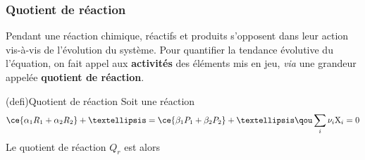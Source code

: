 \documentclass[../../main/main.tex]{subfiles}
\begin{document}

\subsubsection{Quotient de réaction}

Pendant une réaction chimique, réactifs et produits s'opposent dans leur action
vis-à-vis de l'évolution du système.
Pour quantifier la tendance évolutive du l'équation, on fait appel aux
\textbf{activités} des éléments mis en jeu, \textit{via} une grandeur appelée
\textbf{quotient de réaction}.

\begin{tcb*}[label=quoreac](defi){Quotient de réaction}
	Soit une réaction
	\[
		\ce{\alpha_1R_1 + \alpha_2R_2} +…
		=
		\ce{\beta_1P_1 +\beta_2P_2}+…
		\qou
		\sum_i \nu_i\mathrm{X}_i = 0
	\]
	Le quotient de réaction $Q_r$ est alors
	\psw{%
		\[
			\boxed{Q_r = \frac{a(\ce{P_1})^{\beta_1} \times
					a(\ce{P_2})^{\beta_2} \times…}{
					a(\ce{R_1})^{\alpha_1} \times
					a(\ce{R_2})^{\alpha_2} \times…}}
			\qou
			\boxed{Q_r = \prod_i a(\ce{X_i})^{\nu_i}}
		\]
	}%
\end{tcb*}
\end{document}
